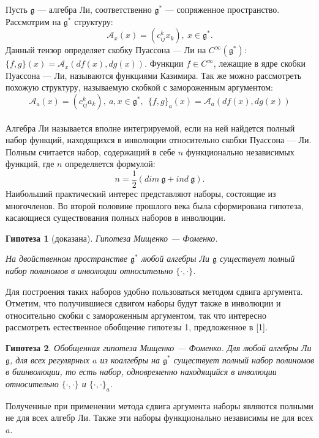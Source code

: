 


\newtheorem{conjecture}{Гипотеза}



\vzmscaption


Пусть $\mathfrak{g}$ --- алгебра Ли, соответственно ${\mathfrak{g}}^*$ --- сопряженное пространство. Рассмотрим на ${\mathfrak{g}^*}$ структуру:
$$
\mathcal{A}_x(x)=(c_{ij}^{k}x_k), \ x\in \mathfrak{g}^*.
$$
Данный тензор определяет скобку Пуассона --- Ли на $C^{\infty}(\mathfrak{g}^*)$: $
\{f,g\}(x)=\mathcal{A}_{x}(df(x),dg(x))
$. Функции $f\in C^{\infty}$, лежащие в ядре скобки Пуассона --- Ли, называются функциями Казимира.
Так же можно рассмотреть похожую структуру, называемую скобкой с замороженным аргументом:
$$
\mathcal{A}_a(x)=(c_{ij}^{k}a_k), \ a, x\in \mathfrak{g}^*, \ \ \{f,g\}_a(x)=\mathcal{A}_{a}(df(x),dg(x))
$$
\\
Алгебра Ли называется вполне интегрируемой, если на ней найдется полный набор функций, находящихся в инволюции относительно скобки Пуассона ---  Ли. Полным считается набор, содержащий в себе $n$ функционально независимых функций, где $n$ определяется формулой:
$$
n = \frac1 2 (dim\ \mathfrak{g}+ind\ \mathfrak{g}).
$$
Наибольший практический интерес представляют наборы, состоящие из многочленов. Во второй половине прошлого века была сформирована гипотеза, касающиеся существования полных наборов в инволюции.
\begin{conjecture}[доказана]{Гипотеза Мищенко --- Фоменко.}

На двойственном пространстве $\mathfrak{g}^*$ любой алгебры Ли $\mathfrak{g}$ существует полный набор полиномов в инволюции относительно $\{\cdot,\cdot\}$.
\end{conjecture}
Для построения таких наборов удобно пользоваться методом сдвига аргумента.
    Отметим, что получившиеся сдвигом наборы будут также в инволюции и относительно скобки с замороженным аргументом, так что интересно рассмотреть естественное обобщение гипотезы 1, предложенное в [1].
    \begin{conjecture}
    {Обобщенная гипотеза Мищенко --- Фоменко.} Для любой алгебры Ли $\mathfrak{g}$, для всех регулярных $a$ из коалгебры на $\mathfrak{g}^*$  существует полный набор полиномов в биинволюции, то есть набор, одновременно находящийся в инволюции относительно $\{\cdot,\cdot\}$  и $\{\cdot,\cdot\}_a$.
    \end{conjecture}
   Полученные при применении метода сдвига аргумента наборы являются полными не для всех алгебр Ли. Также эти наборы функционально независимы не для всех $a$.


